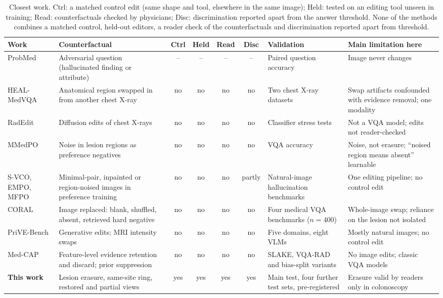 \documentclass[5p,times,twocolumn,authoryear]{elsarticle}
\begin{document}
\begin{table}[!t]
\caption{Closest work. Ctrl: a matched control edit (same shape and tool, elsewhere in the same image); Held: tested on an editing tool unseen in training; Read: counterfactuals checked by physicians; Disc: discrimination reported apart from the answer threshold. None of the methods combines a matched control, held-out editors, a reader check of the counterfactuals and discrimination reported apart from threshold.}
\label{tab:related}
\begin{center}
\scriptsize
\setlength{\tabcolsep}{3pt}
\begin{adjustbox}{max width=\linewidth}
\begin{tabular}{L{2.2cm}L{2.9cm}cccc L{2.0cm}L{2.6cm}}
\toprule
\textbf{Work} & \textbf{Counterfactual} & \textbf{Ctrl} & \textbf{Held} & \textbf{Read} & \textbf{Disc} & \textbf{Validation} & \textbf{Main limitation here} \\
\midrule
ProbMed \citep{yan2024probmed} & Adversarial question (hallucinated finding or attribute) & -- & -- & -- & -- & Paired question accuracy & Image never changes \\
HEAL-MedVQA \citep{healmedvqa2024} & Anatomical region swapped in from another chest X-ray & no & no & no & no & Two chest X-ray datasets & Swap artifacts confounded with evidence removal; one modality \\
RadEdit \citep{perez2024radedit} & Diffusion edits of chest X-rays & no & no & no & no & Classifier stress tests & Not a VQA model; edits not reader-checked \\
MMedPO \citep{zhu2024mmedpo} & Noise in lesion regions as preference negatives & no & no & no & no & VQA accuracy & Noise, not erasure; ``noised region means absent'' learnable \\
S-VCO, EMPO, MFPO \citep{svco2024,wu2025empo,jiang2025mfpo} & Minimal-pair, inpainted or region-noised images in preference training & no & no & no & partly & Natural-image hallucination benchmarks & One editing pipeline; no control edit \\
CORAL \citep{zafar2026coral} & Image replaced: blank, shuffled, absent, retrieved hard negative & no & no & no & no & Four medical VQA benchmarks ($n = 400$) & Whole-image swap; reliance on the lesion not isolated \\
PriVE-Bench \citep{sun2026prive} & Generative edits; MRI intensity swaps & no & no & no & no & Five domains, eight VLMs & Mostly natural images; no control edit \\
Med-CAP \citep{huang2026medcap} & Feature-level evidence retention and discard; prior suppression & no & no & no & no & SLAKE, VQA-RAD and bias-split variants & No image edits; classic VQA models \\
\textbf{This work} & Lesion erasure, same-site ring, restored and partial views & yes & yes & yes & yes & Main test, four further test sets, pre-registered & Erasure valid by readers only in colonoscopy \\
\bottomrule
\end{tabular}
\end{adjustbox}
\end{center}
\end{table}
\end{document}
